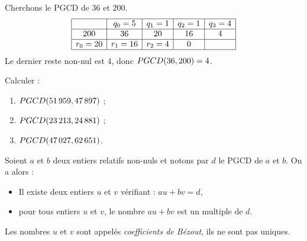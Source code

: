             \begin{ex}
            \label{ex:Algorithme d'Euclide: 36,200}
                  Cherchons le PGCD de $36$ et $200$.
                  \[
                  \begin{array}{|c|c|c|c|c|}
                  \hline 
                           & q_0 = 5  & q_1 = 1   & q_2 = 1 & q_3 = 4 \\ 
                  \hline 
                  200      &      36  &      20   &      16 &       4 \\ 
                  \hline 
                  r_0 = 20 & r_1 = 16 & r_2 = 4   &       0 &         \\ 
                  \hline 
                  \end{array} 
                  \]
                  Le dernier reste non-nul est $4$, donc $PGCD(36,200) = 4$.
            \end{ex}
            \begin{exe}
                  Calculer :
                  \begin{enumerate}[label=\alph*)]
                        \item $PGCD(51\,959,47\,897)$ ;
                        \item $PGCD(23\,213,24\,881)$ ;
                        \item $PGCD(47\,027,62\,651)$.
                  \end{enumerate}
            \end{exe}
            \begin{thm}
                  Soient $a$ et $b$ deux entiers relatifs non-nuls et notons par $d$ le PGCD de $a$ et $b$.
                  On a alors :
                  \begin{itemize}
                        \item Il existe deux entiers $u$ et $v$ v\'erifiant : $a u + b v = d$,
                        \item pour tous entiers $u$ et $v$, le nombre $a u + b v$ est un multiple de $d$.
                  \end{itemize}
                  Les nombres $u$ et $v$ sont appel\'es \emph{coefficients de B\'ezout},
                  ils ne sont pas uniques.
            \end{thm}

